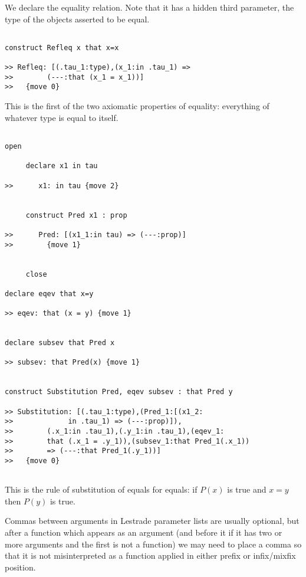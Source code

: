 \documentclass[12pt]{article}
\begin{document}
We declare the equality relation.  Note that it has a hidden third parameter, the type of the objects asserted to be equal.

\begin{verbatim}

construct Refleq x that x=x

>> Refleq: [(.tau_1:type),(x_1:in .tau_1) => 
>>        (---:that (x_1 = x_1))]
>>   {move 0}

\end{verbatim}

This is the first of the two axiomatic properties of equality:  everything of whatever type is equal to itself.

\begin{verbatim}

open

     declare x1 in tau

>>      x1: in tau {move 2}


     construct Pred x1 : prop

>>      Pred: [(x1_1:in tau) => (---:prop)]
>>        {move 1}


     close

declare eqev that x=y

>> eqev: that (x = y) {move 1}


declare subsev that Pred x

>> subsev: that Pred(x) {move 1}


construct Substitution Pred, eqev subsev : that Pred y

>> Substitution: [(.tau_1:type),(Pred_1:[(x1_2:
>>             in .tau_1) => (---:prop)]),
>>        (.x_1:in .tau_1),(.y_1:in .tau_1),(eqev_1:
>>        that (.x_1 = .y_1)),(subsev_1:that Pred_1(.x_1)) 
>>        => (---:that Pred_1(.y_1))]
>>   {move 0}


\end{verbatim}

This is the rule of substitution of equals for equals:  if $P(x)$ is true and $x=y$ then $P(y)$ is true.

Commas between arguments in Lestrade parameter lists are usually optional, but after a function which appears as an argument (and before it if it has two or more arguments and the first is not a function) we may need to place a comma so that it is not misinterpreted as a function applied in either prefix or infix/mixfix position.
\end{document}
